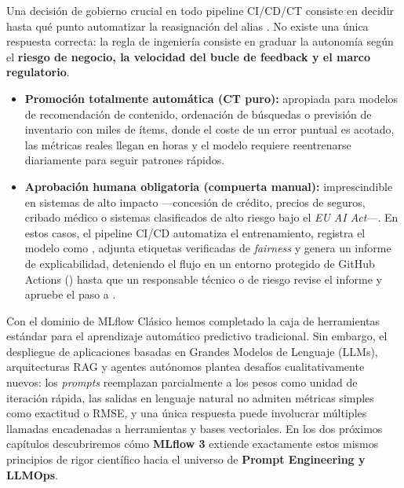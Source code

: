 \begin{examplebox}
Una decisión de gobierno crucial en todo pipeline CI/CD/CT consiste en decidir hasta qué punto automatizar la reasignación del alias . No existe una única respuesta correcta: la regla de ingeniería consiste en graduar la autonomía según el \textbf{riesgo de negocio, la velocidad del bucle de feedback y el marco regulatorio}.
\begin{itemize}
  \item \textbf{Promoción totalmente automática (CT puro):} apropiada para modelos de recomendación de contenido, ordenación de búsquedas o previsión de inventario con miles de ítems, donde el coste de un error puntual es acotado, las métricas reales llegan en horas y el modelo requiere reentrenarse diariamente para seguir patrones rápidos.
  \item \textbf{Aprobación humana obligatoria (compuerta manual):} imprescindible en sistemas de alto impacto ---concesión de crédito, precios de seguros, cribado médico o sistemas clasificados de alto riesgo bajo el \textit{EU AI Act}---. En estos casos, el pipeline CI/CD automatiza el entrenamiento, registra el modelo como , adjunta etiquetas verificadas de \textit{fairness} y genera un informe de explicabilidad, deteniendo el flujo en un entorno protegido de GitHub Actions () hasta que un responsable técnico o de riesgo revise el informe y apruebe el paso a .
\end{itemize}
\end{examplebox}

Con el dominio de MLflow Clásico hemos completado la caja de herramientas estándar para el aprendizaje automático predictivo tradicional. Sin embargo, el despliegue de aplicaciones basadas en Grandes Modelos de Lenguaje (LLMs), arquitecturas RAG y agentes autónomos plantea desafíos cualitativamente nuevos: los \textit{prompts} reemplazan parcialmente a los pesos como unidad de iteración rápida, las salidas en lenguaje natural no admiten métricas simples como exactitud o RMSE, y una única respuesta puede involucrar múltiples llamadas encadenadas a herramientas y bases vectoriales. En los dos próximos capítulos descubriremos cómo \textbf{MLflow 3} extiende exactamente estos mismos principios de rigor científico hacia el universo de \textbf{Prompt Engineering y LLMOps}.
